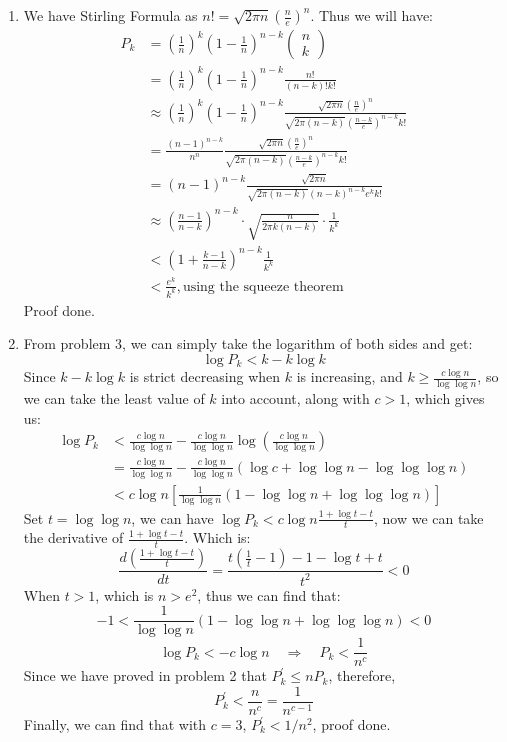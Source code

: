 \documentclass[12pt, a4paper]{article}
\begin{document}
\begin{enumerate}
    \item We have Stirling Formula as $n! = \sqrt{2\pi n}(\frac{n}{e})^n$. Thus we will have: 
          \begin{align*}
              P_k &= (\frac{1}{n})^k (1 - \frac{1}{n})^{n - k} \begin{pmatrix} n\\ k \end{pmatrix}\\
                  &= (\frac{1}{n})^k (1 - \frac{1}{n})^{n - k} \frac{n!}{(n-k)!k!}\\
                  &\approx (\frac{1}{n})^k (1 - \frac{1}{n})^{n - k} \frac{\sqrt{2\pi n}(\frac{n}{e})^n}{\sqrt{2\pi (n-k)}(\frac{n-k}{e})^{n-k} k!}\\
                  &= \frac{(n-1)^{n-k}}{n^n} \frac{\sqrt{2\pi n}(\frac{n}{e})^n}{\sqrt{2\pi (n-k)}(\frac{n-k}{e})^{n-k} k!}\\
                  &= (n-1)^{n-k} \frac{\sqrt{2\pi n}}{\sqrt{2\pi (n-k)} (n-k)^{n-k} e^k k!}\\
                  &\approx (\frac{n-1}{n-k})^{n-k}\cdot \sqrt{\frac{n}{2\pi k(n-k)}}\cdot \frac{1}{k^k}\\
                  &< (1 + \frac{k-1}{n-k})^{n-k} \frac{1}{k^k}\\
                  &< \frac{e^k}{k^k}, \text{using the squeeze theorem}
          \end{align*}
          Proof done.
    
    \item From problem 3, we can simply take the logarithm of both sides and get:
          $$\log P_k < k - k\log k$$
          Since $k - k\log k$ is strict decreasing when $k$ is increasing, and $k \geq \frac{c\log n}{\log \log n}$, 
          so we can take the least value of $k$ into account, along with $c > 1$, which gives us: 
          \begin{align*}
              \log P_k &< \frac{c\log n}{\log \log n} - \frac{c\log n}{\log \log n} \log (\frac{c\log n}{\log \log n})\\
                       &= \frac{c\log n}{\log \log n} - \frac{c\log n}{\log \log n}(\log c + \log \log n - \log \log \log n)\\
                       &< c\log n[\frac{1}{\log \log n} (1 - \log \log n + \log \log \log n) ]
          \end{align*}
          Set $t = \log \log n$, we can have $\log P_k < c \log n \frac{1 + \log t - t}{t}$, 
          now we can take the derivative of $\frac{1 + \log t - t}{t}$. Which is: 
          $$\frac{d(\frac{1 + \log t - t}{t})}{dt} = \frac{t(\frac{1}{t} - 1) - 1 - \log t + t}{t^2} < 0$$
          When $t > 1$, which is $n > e^2$, thus we can find that: 
          $$-1 < \frac{1}{\log \log n} (1 - \log \log n + \log \log \log n) < 0$$
          $$\log P_k < -c\log n \quad \Rightarrow \quad P_k < \frac{1}{n^c}$$
          Since we have proved in problem 2 that $P_k^\prime \leq nP_k$, therefore, 
          $$P_k^\prime < \frac{n}{n^c} = \frac{1}{n^{c-1}}$$
          Finally, we can find that with $c = 3$, $P_k^\prime < 1/n^2$, proof done.


\end{enumerate}
\end{document}
